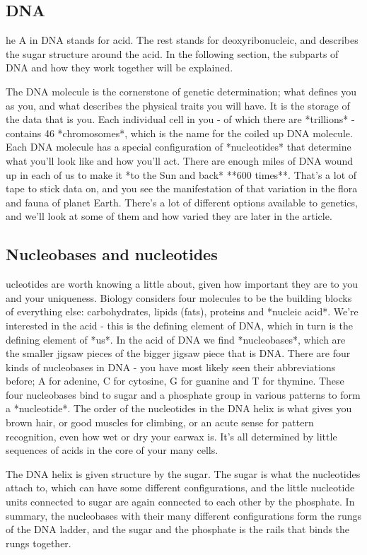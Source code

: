 \subsection{DNA}
he A in DNA stands for acid. The rest stands for deoxyribonucleic, and describes the sugar structure around the acid. In the following section, the subparts of DNA and how they work together will be explained. 

The DNA molecule is the cornerstone of genetic determination; what defines you as you, and what describes the physical traits you will have.  It is the storage of the data that is you. Each individual cell in you - of which there are *trillions* - contains 46 *chromosomes*, which is the name for the coiled up DNA molecule. Each DNA molecule has a special configuration of *nucleotides* that determine what you'll look like and how you'll act. There are enough miles of DNA wound up in each of us to make it *to the Sun and back* **600 times**. That's a lot of tape to stick data on, and you see the manifestation of that variation in the flora and fauna of planet Earth. There's a lot of different options available to genetics, and we'll look at some of them and how varied they are later in the article. 

\subsection{Nucleobases and nucleotides}
ucleotides are worth knowing a little about, given how important they are to you and your uniqueness. Biology considers four molecules to be the building blocks of everything else: carbohydrates, lipids (fats), proteins and *nucleic acid*. We're interested in the acid - this is the defining element of DNA, which in turn is the defining element of *us*. In the acid of DNA we find *nucleobases*, which are the smaller jigsaw pieces of the bigger jigsaw piece that is DNA. There are four kinds of nucleobases in DNA - you have most likely seen their abbreviations before; A for adenine, C for cytosine, G for guanine and T for thymine. These four nucleobases bind to sugar and a phosphate group in various patterns to form a *nucleotide*. The order of the nucleotides in the DNA helix is what gives you brown hair, or good muscles for climbing, or an acute sense for pattern recognition, even how wet or dry your earwax is. It's all determined by little sequences of acids in the core of your many cells.

The DNA helix is given structure by the sugar. The sugar is what the nucleotides attach to, which can have some different configurations, and the little nucleotide units connected to sugar are again connected to each other by the phosphate. In summary, the nucleobases with their many different configurations form the rungs of the DNA ladder, and the sugar and the phosphate is the rails that binds the rungs together.


